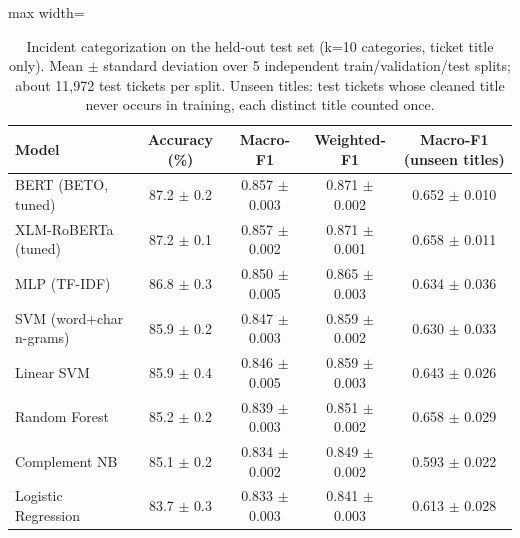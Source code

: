 \begin{table}[!t]
\centering
\caption{Incident categorization on the held-out test set (k=10 categories, ticket title only). Mean $\pm$ standard deviation over 5 independent train/validation/test splits; about 11,972 test tickets per split. Unseen titles: test tickets whose cleaned title never occurs in training, each distinct title counted once.}
\label{tab:main}
\footnotesize
\begin{adjustbox}{max width=\textwidth}
\begin{tabular}{lcccc}
\hline
Model & Accuracy (\%) & Macro-F1 & Weighted-F1 & Macro-F1 (unseen titles) \\
\hline
BERT (BETO, tuned) & 87.2 $\pm$ 0.2 & 0.857 $\pm$ 0.003 & 0.871 $\pm$ 0.002 & 0.652 $\pm$ 0.010 \\
XLM-RoBERTa (tuned) & 87.2 $\pm$ 0.1 & 0.857 $\pm$ 0.002 & 0.871 $\pm$ 0.001 & 0.658 $\pm$ 0.011 \\
MLP (TF-IDF) & 86.8 $\pm$ 0.3 & 0.850 $\pm$ 0.005 & 0.865 $\pm$ 0.003 & 0.634 $\pm$ 0.036 \\
SVM (word+char n-grams) & 85.9 $\pm$ 0.2 & 0.847 $\pm$ 0.003 & 0.859 $\pm$ 0.002 & 0.630 $\pm$ 0.033 \\
Linear SVM & 85.9 $\pm$ 0.4 & 0.846 $\pm$ 0.005 & 0.859 $\pm$ 0.003 & 0.643 $\pm$ 0.026 \\
Random Forest & 85.2 $\pm$ 0.2 & 0.839 $\pm$ 0.003 & 0.851 $\pm$ 0.002 & 0.658 $\pm$ 0.029 \\
Complement NB & 85.1 $\pm$ 0.2 & 0.834 $\pm$ 0.002 & 0.849 $\pm$ 0.002 & 0.593 $\pm$ 0.022 \\
Logistic Regression & 83.7 $\pm$ 0.3 & 0.833 $\pm$ 0.003 & 0.841 $\pm$ 0.003 & 0.613 $\pm$ 0.028 \\
\hline
\end{tabular}
\end{adjustbox}
\end{table}
